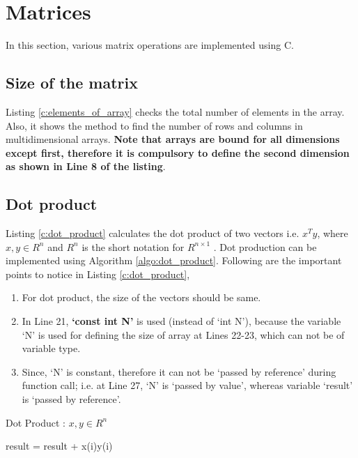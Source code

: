 \section{Matrices}

In this section, various matrix operations are implemented using C. 
\subsection{Size of the matrix}
Listing \ref{c:elements_of_array} checks the total number of elements in the array. Also, it shows the method to find the number of rows and columns in multidimensional arrays. \textbf{Note that arrays are bound for all dimensions except first, therefore it is compulsory to define the second dimension as shown in Line 8 of the listing}.
 


\subsection{Dot product}

Listing \ref{c:dot_product} calculates the dot product of two vectors i.e. $x^T y$, where $x,y \in {R^n}$ and ${R^n}$ is the short notation for ${R^{n \times 1}}$ . Dot production can be implemented using Algorithm \ref{algo:dot_product}. Following are the important points to notice in Listing \ref{c:dot_product}, 

\begin{enumerate}
	\item For dot product, the size of the vectors should be same. 
	\item In Line 21, \textbf{`const int N'} is used (instead of `int N'), because the variable `N' is used for defining the size of array at Lines 22-23, which can not be of variable type. 
	\item Since, `N' is constant, therefore it can not be `passed by reference' during function call; i.e. at Line 27, `N' is `passed by value', whereas variable `result' is `passed by reference'. 
\end{enumerate}

\begin{algorithm}
	\caption{Dot Product : $x,y \in {R^n}$}
	\label{algo:dot_product}
	\begin{algorithmic}[1]
			\State result = result + x(i)y(i)
		\EndFor
	\end{algorithmic}
\end{algorithm}

